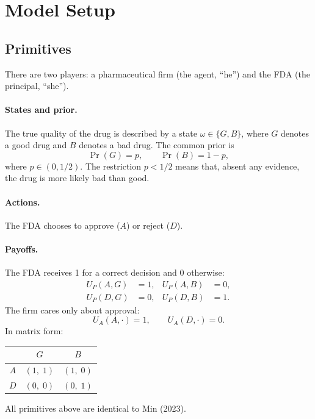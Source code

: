 \documentclass[12pt,a4paper]{article}
\begin{document}
\section{Model Setup}

\subsection{Primitives}

There are two players: a pharmaceutical firm (the agent,
``he'') and the FDA (the principal, ``she'').

\paragraph{States and prior.}
The true quality of the drug is described by a state
$\omega \in \{G, B\}$, where $G$ denotes a good drug and $B$
denotes a bad drug. The common prior is
\begin{equation}
  \Pr(G) = p, \qquad \Pr(B) = 1 - p,
\end{equation}
where $p \in (0, 1/2)$. The restriction $p < 1/2$ means that,
absent any evidence, the drug is more likely bad than good.

\paragraph{Actions.}
The FDA chooses to approve ($A$) or reject ($D$).

\paragraph{Payoffs.}
The FDA receives 1 for a correct decision and 0 otherwise:
\begin{equation}\label{eq:fda_payoff}
\begin{aligned}
  U_P(A, G) &= 1, & U_P(A, B) &= 0, \\
  U_P(D, G) &= 0, & U_P(D, B) &= 1.
\end{aligned}
\end{equation}
The firm cares only about approval:
\begin{equation}\label{eq:firm_payoff}
  U_A(A, \cdot) = 1, \qquad U_A(D, \cdot) = 0.
\end{equation}
In matrix form:
\begin{center}
\begin{tabular}{c|cc}
         & $G$       & $B$       \\ \hline
  $A$    & $(1,\;1)$ & $(1,\;0)$ \\
  $D$    & $(0,\;0)$ & $(0,\;1)$
\end{tabular}
\end{center}
All primitives above are identical to Min (2023).
\end{document}
